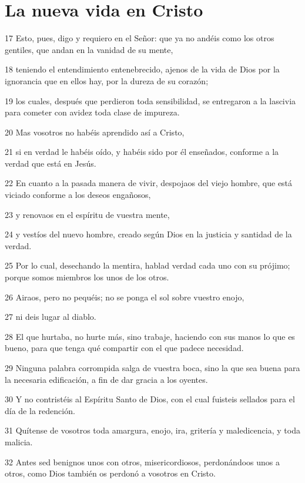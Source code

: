 \section*{La nueva vida en Cristo}

\par 17 Esto, pues, digo y requiero en el Señor: que ya no andéis como los otros gentiles, que andan en la vanidad de su mente,
\par 18 teniendo el entendimiento entenebrecido, ajenos de la vida de Dios por la ignorancia que en ellos hay, por la dureza de su corazón;
\par 19 los cuales, después que perdieron toda sensibilidad, se entregaron a la lascivia para cometer con avidez toda clase de impureza.
\par 20 Mas vosotros no habéis aprendido así a Cristo,
\par 21 si en verdad le habéis oído, y habéis sido por él enseñados, conforme a la verdad que está en Jesús.
\par 22 En cuanto a la pasada manera de vivir, despojaos del viejo hombre, que está viciado conforme a los deseos engañosos,
\par 23 y renovaos en el espíritu de vuestra mente,
\par 24 y vestíos del nuevo hombre, creado según Dios en la justicia y santidad de la verdad.
\par 25 Por lo cual, desechando la mentira, hablad verdad cada uno con su prójimo; porque somos miembros los unos de los otros.
\par 26 Airaos, pero no pequéis; no se ponga el sol sobre vuestro enojo,
\par 27 ni deis lugar al diablo.
\par 28 El que hurtaba, no hurte más, sino trabaje, haciendo con sus manos lo que es bueno, para que tenga qué compartir con el que padece necesidad.
\par 29 Ninguna palabra corrompida salga de vuestra boca, sino la que sea buena para la necesaria edificación, a fin de dar gracia a los oyentes.
\par 30 Y no contristéis al Espíritu Santo de Dios, con el cual fuisteis sellados para el día de la redención.
\par 31 Quítense de vosotros toda amargura, enojo, ira, gritería y maledicencia, y toda malicia.
\par 32 Antes sed benignos unos con otros, misericordiosos, perdonándoos unos a otros, como Dios también os perdonó a vosotros en Cristo.


